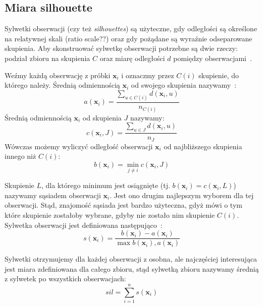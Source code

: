\documentclass{praca1}
\begin{document}
\subsection{Miara silhouette}

Sylwetki obserwacji (czy też \emph{silhouettes}) są użyteczne, gdy odległości są określone na relatywnej skali (ratio scale??) oraz gdy pożądane są wyraźnie odseparowane skupienia. Aby skonstruować sylwetkę obserwacji potrzebne są dwie rzeczy: podział zbioru na skupienia $C$ oraz miarę odległości $d$ pomiędzy obserwacjami~\cite{Rousseeuw1987:silhoutte}.

Weźmy każdą obserwację z próbki $\mathbf{x}_i$ i oznaczmy przez $C(i)$ skupienie, do którego należy. Średnią odmiennością $\mathbf{x}_i$ od swojego skupienia nazywamy~\cite{Rousseeuw1987:silhoutte}:
\begin{equation*}
a(\mathbf{x}_i) = \frac{\sum_{u \in C(i)} d(\mathbf{x}_i, u)}{n_{C(i)}}
\end{equation*}
Średnią odmiennością $\mathbf{x}_i$ od skupienia $J$ nazywamy:
\begin{equation*}
c(\mathbf{x}_i, J) = \frac{\sum_{u \in J} d(\mathbf{x}_i, u)}{n_{J}}
\end{equation*}
Wówczas możemy wyliczyć odległość obserwacji $\mathbf{x}_i$ od najbliższego skupienia innego niż $C(i)$:
\begin{equation*}
b(\mathbf{x}_i) = \min\limits_{j \neq i} c(\mathbf{x}_i, J)
\end{equation*}

Skupienie $L$, dla którego minimum jest osiągnięte (tj. $b(\mathbf{x}_i) = c(\mathbf{x}_i, L)$) nazywamy sąsiadem obserwacji $\mathbf{x}_i$. Jest ono drugim najlepszym wyborem dla tej obserwacji. Stąd, znajomość sąsiada jest bardzo użyteczna, gdyż mówi o tym które skupienie zostałoby wybrane, gdyby nie zostało nim skupienie $C(i)$. Sylwetka obserwacji jest definiowana następująco~\cite{Rousseeuw1987:silhoutte}:
\begin{equation*}
s(\mathbf{x}_i) = \frac{b(\mathbf{x}_i) - a(\mathbf{x}_i)}{\max{b(\mathbf{x}_i), a(\mathbf{x}_i)}}
\end{equation*}

Sylwetki otrzymujemy dla każdej obserwacji z osobna, ale najczęściej interesująca jest miara zdefiniowana dla całego zbioru, stąd sylwetką zbioru nazywamy średnią z sylwetek po wszystkich obserwacjach:
\begin{equation*}
sil = \sum\limits_{i=1}^{n}s(\mathbf{x}_i)
\end{equation*}
\end{document}
